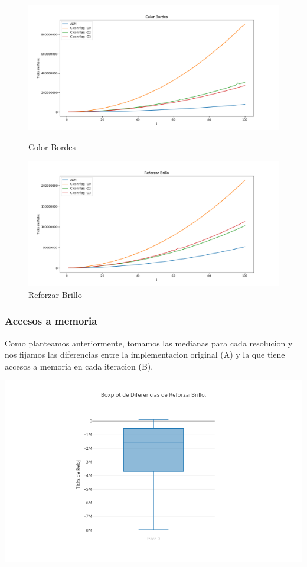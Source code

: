 \documentclass[a4paper]{article}
\begin{document}
\begin{figure}[h!]			
	\includegraphics[width=\linewidth]{img/colorBordes.png}
	\caption{Color Bordes}
	\includegraphics[width=\linewidth]{img/reforzarBrillo.png}
	\caption{Reforzar Brillo}
\end{figure}


\clearpage

\subsubsection{Accesos a memoria}

Como planteamos anteriormente, tomamos las medianas para cada resolucion y nos fijamos las diferencias entre la implementacion original (A) y la que tiene accesos a memoria en cada iteracion (B).


\includegraphics[scale=0.5]{img/BoxplotReforzarBrillo.png}
\end{document}
